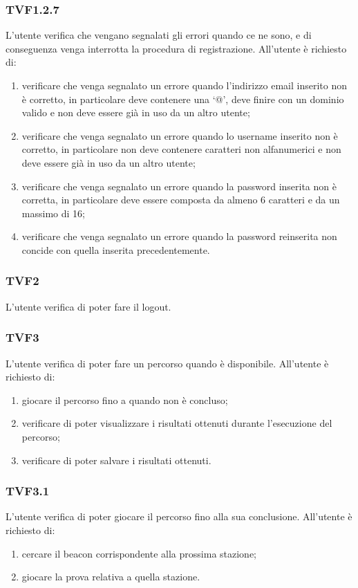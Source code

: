 		\subsubsection{TVF1.2.7}
			L'utente verifica che vengano segnalati gli errori quando ce ne sono, e di conseguenza venga interrotta la procedura di registrazione.
			All'utente è richiesto di:
			\begin{enumerate}
				\item verificare che venga segnalato un errore quando l'indirizzo email inserito non è corretto, in particolare deve contenere una `@', deve finire con un dominio valido e non deve essere già in uso da un altro utente;
				\item verificare che venga segnalato un errore quando lo username inserito non è corretto, in particolare non deve contenere caratteri non alfanumerici e non deve essere già in uso da un altro utente;
				\item verificare che venga segnalato un errore quando la password inserita non è corretta, in particolare deve essere composta da almeno 6 caratteri e da un massimo di 16;
				\item verificare che venga segnalato un errore quando la password reinserita non concide con quella inserita precedentemente.
			\end{enumerate}
		\subsubsection{TVF2}
			L'utente verifica di poter fare il logout.
		\subsubsection{TVF3}
			L'utente verifica di poter fare un percorso quando è disponibile.
			All'utente è richiesto di:
			\begin{enumerate}
				\item giocare il percorso fino a quando non è concluso;
				\item verificare di poter visualizzare i risultati ottenuti durante l'esecuzione del percorso;
				\item verificare di poter salvare i risultati ottenuti.
			\end{enumerate}
		\subsubsection{TVF3.1}
			L'utente verifica di poter giocare il percorso fino alla sua conclusione.
			All'utente è richiesto di:
			\begin{enumerate}
				\item cercare il beacon corrispondente alla prossima stazione;
				\item giocare la prova relativa a quella stazione.
			\end{enumerate}
